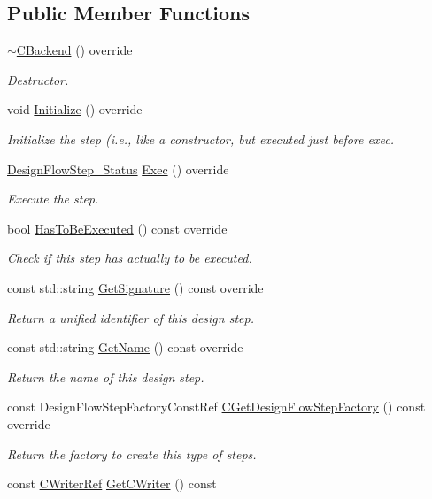 \subsection*{Public Member Functions}
\begin{DoxyCompactItemize}
\item 
\hyperlink{classCBackend_ae558a515c1e10643bf4016ab63493160}{$\sim$\+C\+Backend} () override
\begin{DoxyCompactList}\small\item\em Destructor. \end{DoxyCompactList}\item 
void \hyperlink{classCBackend_a9c77a707b51fd49230668549eb1fd8db}{Initialize} () override
\begin{DoxyCompactList}\small\item\em Initialize the step (i.\+e., like a constructor, but executed just before exec. \end{DoxyCompactList}\item 
\hyperlink{design__flow__step_8hpp_afb1f0d73069c26076b8d31dbc8ebecdf}{Design\+Flow\+Step\+\_\+\+Status} \hyperlink{classCBackend_ab35c39606dc2d39998ccd35edf7c82df}{Exec} () override
\begin{DoxyCompactList}\small\item\em Execute the step. \end{DoxyCompactList}\item 
bool \hyperlink{classCBackend_a9cedb79a577526fabd2e396c6697eaf1}{Has\+To\+Be\+Executed} () const override
\begin{DoxyCompactList}\small\item\em Check if this step has actually to be executed. \end{DoxyCompactList}\item 
const std\+::string \hyperlink{classCBackend_aa66a47377656d5f70e26c4dd96de7ab6}{Get\+Signature} () const override
\begin{DoxyCompactList}\small\item\em Return a unified identifier of this design step. \end{DoxyCompactList}\item 
const std\+::string \hyperlink{classCBackend_af879cc47d9bc18eb778390825b85667d}{Get\+Name} () const override
\begin{DoxyCompactList}\small\item\em Return the name of this design step. \end{DoxyCompactList}\item 
const Design\+Flow\+Step\+Factory\+Const\+Ref \hyperlink{classCBackend_ae88e75e47f68079871cad2be17fde136}{C\+Get\+Design\+Flow\+Step\+Factory} () const override
\begin{DoxyCompactList}\small\item\em Return the factory to create this type of steps. \end{DoxyCompactList}\item 
const \hyperlink{c__writer_8hpp_a4e9c4dfe17e35f981e27b6dd97f9632c}{C\+Writer\+Ref} \hyperlink{classCBackend_a38b67519696c9c3cc4c395fcf16b973d}{Get\+C\+Writer} () const
\end{DoxyCompactItemize}
